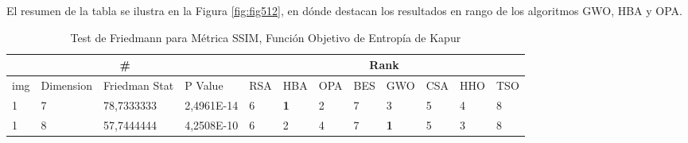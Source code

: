 \documentclass[conference]{IEEEtran}
\begin{document}
\noindent El resumen de la tabla se ilustra en la Figura \ref{fig:fig512}, en dónde destacan los resultados en rango de los algoritmos GWO, HBA y OPA.
\begin{table}[]
	\centering
	\caption{Test de Friedmann para Métrica SSIM, Función Objetivo de Entropía de Kapur}
	\begin{tabular}{|llll|llllllll|}
		\hline
		\multicolumn{4}{|c|}{\#} & \multicolumn{8}{c|}{Rank} \\ \hline
		\multicolumn{1}{|l|}{img} & \multicolumn{1}{l|}{Dimension} & \multicolumn{1}{l|}{Friedman Stat} & P Value & \multicolumn{1}{l|}{RSA} & \multicolumn{1}{l|}{HBA} & \multicolumn{1}{l|}{OPA} & \multicolumn{1}{l|}{BES} & \multicolumn{1}{l|}{GWO} & \multicolumn{1}{l|}{CSA} & \multicolumn{1}{l|}{HHO} & TSO \\ \hline                                                                                                                                                                       
\multicolumn{1}{|l|}{1}                                                     & \multicolumn{1}{l|}{7}                                                        & \multicolumn{1}{l|}{78,7333333}                                                   & 2,4961E-14                     & \multicolumn{1}{l|}{6}                                                  & \multicolumn{1}{l|}{\textbf{1}}                                         & \multicolumn{1}{l|}{2}                                                  & \multicolumn{1}{l|}{7}                                                  & \multicolumn{1}{l|}{3}                                                  & \multicolumn{1}{l|}{5}                                                  & \multicolumn{1}{l|}{4}                                                  & 8                          \\ \hline
\multicolumn{1}{|l|}{1}                                                     & \multicolumn{1}{l|}{8}                                                        & \multicolumn{1}{l|}{57,7444444}                                                   & 4,2508E-10                     & \multicolumn{1}{l|}{6}                                                  & \multicolumn{1}{l|}{2}                                                  & \multicolumn{1}{l|}{4}                                                  & \multicolumn{1}{l|}{7}                                                  & \multicolumn{1}{l|}{\textbf{1}}                                         & \multicolumn{1}{l|}{5}                                                  & \multicolumn{1}{l|}{3}                                                  & 8                          \\ \hline

\end{tabular}
\end{table}
\end{document}
